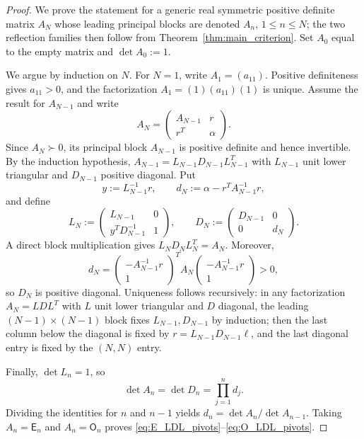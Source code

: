 \documentclass[preprint,12pt]{elsarticle}
\numberwithin{equation}{section}
\theoremstyle{plain}
\theoremstyle{definition}
\theoremstyle{remark}
\newcommand{\E}{\mathsf E}
\newcommand{\Omat}{\mathsf O}
\begin{document}
\begin{proof}
We prove the statement for a generic real symmetric positive definite matrix $A_N$ whose leading principal blocks are denoted $A_n$, $1\le n\le N$; the two reflection families then follow from Theorem~\ref{thm:main_criterion}.  Set $A_0$ equal to the empty matrix and $\det A_0:=1$.

We argue by induction on $N$.  For $N=1$, write $A_1=(a_{11})$.  Positive definiteness gives $a_{11}>0$, and the factorization $A_1=(1)(a_{11})(1)$ is unique.  Assume the result for $A_{N-1}$ and write
\begin{equation}
A_N=\begin{pmatrix}A_{N-1}&r\\ r^T&\alpha\end{pmatrix}.
\end{equation}
Since $A_N\succ0$, its principal block $A_{N-1}$ is positive definite and hence invertible.  By the induction hypothesis,
$A_{N-1}=L_{N-1}D_{N-1}L_{N-1}^T$ with $L_{N-1}$ unit lower triangular and $D_{N-1}$ positive diagonal.  Put
\begin{equation}
y:=L_{N-1}^{-1}r,
\qquad
 d_N:=\alpha-r^TA_{N-1}^{-1}r,
\end{equation}
and define
\begin{equation}
L_N:=\begin{pmatrix}L_{N-1}&0\\ y^TD_{N-1}^{-1}&1\end{pmatrix},
\qquad
D_N:=\begin{pmatrix}D_{N-1}&0\\0&d_N\end{pmatrix}.
\end{equation}
A direct block multiplication gives $L_ND_NL_N^T=A_N$.  Moreover,
\begin{equation}
d_N=
\begin{pmatrix}-A_{N-1}^{-1}r\\1\end{pmatrix}^{T}
A_N
\begin{pmatrix}-A_{N-1}^{-1}r\\1\end{pmatrix}>0,
\end{equation}
so $D_N$ is positive diagonal.  Uniqueness follows recursively: in any factorization $A_N=LDL^T$ with $L$ unit lower triangular and $D$ diagonal, the leading $(N-1)\times(N-1)$ block fixes $L_{N-1},D_{N-1}$ by induction; then the last column below the diagonal is fixed by $r=L_{N-1}D_{N-1}\ell$, and the last diagonal entry is fixed by the $(N,N)$ entry.

Finally, $\det L_n=1$, so
\begin{equation}
\det A_n=\det D_n=\prod_{j=1}^{n}d_j.
\end{equation}
Dividing the identities for $n$ and $n-1$ yields $d_n=\det A_n/\det A_{n-1}$.  Taking $A_n=\E_n$ and $A_n=\Omat_n$ proves \eqref{eq:E_LDL_pivots}--\eqref{eq:O_LDL_pivots}.
\end{proof}
\end{document}
